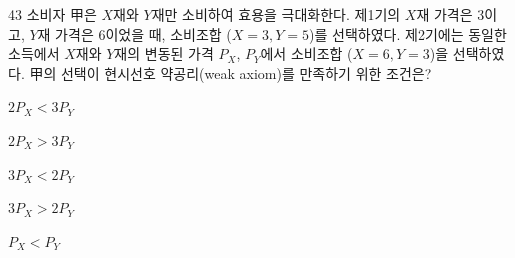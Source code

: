 \begin{question}{43}
소비자 甲은 ${ X }$재와 ${ Y }$재만 소비하여 효용을 극대화한다. 제1기의 ${ X }$재 가격은 3이고, ${ Y }$재 가격은 6이었을 때, 소비조합 (${ X=3, Y=5 }$)를 선택하였다. 제2기에는 동일한 소득에서 ${ X }$재와 ${ Y }$재의 변동된 가격 ${ P_{ X } }$, ${ P_{ Y } }$에서 소비조합 (${ X=6, Y=3 }$)을 선택하였다. 甲의 선택이 현시선호 약공리(weak axiom)를 만족하기 위한 조건은?
\begin{choices}
  \item $2P_{ X } < 3P_{ Y }$
  \item $2P_{ X } >3P_{ Y }$
  \item $3P_{ X } <2P_{ Y }$
  \item $3P_{ X } >2P_{ Y }$
  \item $P_{ X } <P_{ Y }$
\end{choices}
\end{question}
